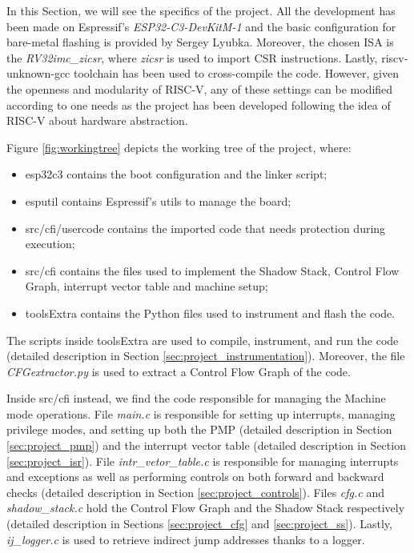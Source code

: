 In this Section, we will see the specifics of the project. All the development has
been made on Espressif's \textit{ESP32-C3-DevKitM-1} \cite{esp32c3} and the
basic configuration for bare-metal flashing is provided by Sergey Lyubka\cite{mdk}.
Moreover, the chosen ISA is the \textit{RV32imc\_zicsr}, where \textit{zicsr} is
used to import CSR instructions. Lastly, {riscv-unknown-gcc} toolchain has been
used to cross-compile the code. However, given the openness and modularity of
RISC-V, any of these settings can be modified according to one needs as the project
has been developed following the idea of RISC-V about hardware abstraction.

Figure \ref{fig:workingtree} depicts the working tree of the project, where:
\begin{itemize}
  \item esp32c3 contains the boot configuration and the linker script;

  \item esputil contains Espressif's utils to manage the board;

  \item src/cfi/usercode contains the imported code that needs protection during
    execution;

  \item src/cfi contains the files used to implement the Shadow Stack, Control
    Flow Graph, interrupt vector table and machine setup;

  \item toolsExtra contains the Python files used to instrument and flash the code.
\end{itemize}

The scripts inside toolsExtra are used to compile, instrument, and run the code
(detailed description in Section \ref{sec:project_instrumentation}). Moreover,
the file \textit{CFGextractor.py} is used to extract a Control Flow Graph of the
code.

Inside src/cfi instead, we find the code responsible for managing the Machine
mode operations. File \textit{main.c} is responsible for setting up interrupts, managing
privilege modes, and setting up both the PMP (detailed description in Section \ref{sec:project_pmp})
and the interrupt vector table (detailed description in Section \ref{sec:project_isr}).
File \textit{intr\_vetor\_table.c} is responsible for managing interrupts and
exceptions as well as performing controls on both forward and backward checks (detailed
description in Section \ref{sec:project_controls}). Files \textit{cfg.c} and
\textit{shadow\_stack.c} hold the Control Flow Graph and the Shadow Stack respectively
(detailed description in Sections \ref{sec:project_cfg} and \ref{sec:project_ss}).
Lastly, \textit{ij\_logger.c} is used to retrieve indirect jump addresses thanks
to a logger.

